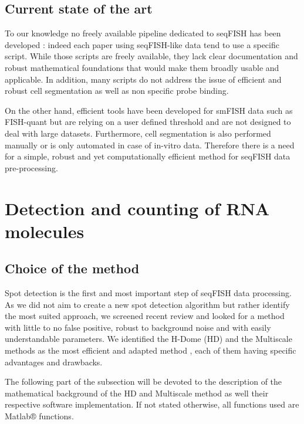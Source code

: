 \documentclass[12pt]{article}
\begin{document}
\subsection{Current state of the art}

To our knowledge no freely available pipeline dedicated to seqFISH has been developed : indeed each paper using seqFISH-like data tend to use a specific script. While those scripts are freely available, they lack clear documentation and robust mathematical foundations that would make them broadly usable and applicable. In addition, many scripts do not address the issue of efficient and robust cell segmentation as well as non specific probe binding.

On the other hand, efficient tools have been developed for smFISH data such as FISH-quant \citep{mueller_fish-quant:_2013} but are relying on a user defined threshold and are not designed to deal with large datasets. Furthermore, cell segmentation is also performed manually or is only automated in case of in-vitro data.
Therefore there is a need for a simple, robust and yet computationally efficient method for seqFISH data pre-processing.

\section{Detection and counting of RNA molecules}

\subsection{Choice of the method}

Spot detection is the first and most important step of seqFISH data processing. As we did not aim to create a new spot detection algorithm but rather identify the most suited approach, we screened recent review\citep{ruusuvuori_evaluation_2010,smal_quantitative_2010,stepka_performance_2015} and looked for a method with little to no false positive, robust to background noise and with easily understandable parameters. We identified the H-Dome (HD) and the Multiscale methods as the most efficient and adapted method \citep{smal_quantitative_2010,stepka_performance_2015}, each of them having specific advantages and drawbacks.

The following part of the subsection will be devoted to the description of the mathematical background of the HD and Multiscale method as well their respective software implementation. If not stated otherwise, all functions used are Matlab® functions.
\end{document}
